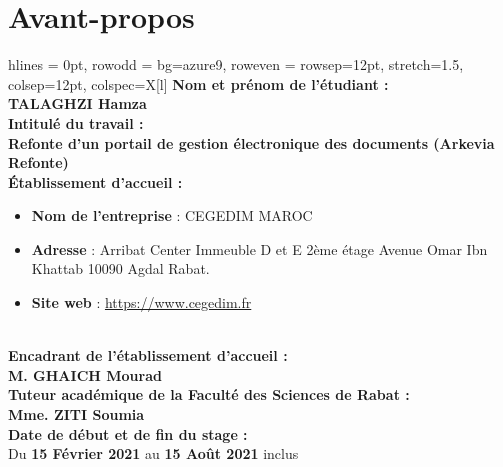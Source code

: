{}
\noindent \section*{Avant-propos}
\vspace{0.25cm}
\begin{table}[htb!]
    \centering
    \begin{tblr}{ 
    hlines = {0pt},
 row{odd} = {bg=azure9},
  row{even} = {rowsep=12pt},
 stretch=1.5,
 colsep=12pt,
 colspec={X[l]}
}
 \textbf{Nom et prénom de l’étudiant :} \\
 \textbf{TALAGHZI Hamza}\\
 \textbf{Intitulé du travail :}\\
\textbf{Refonte d'un portail de gestion électronique des documents (Arkevia Refonte)}\\
\textbf{Établissement d’accueil :}\\
\begin{minipage} [t] {0.9\textwidth} 
\begin{itemize}
    \item \textbf{Nom de l'entreprise} : CEGEDIM MAROC
    \item \textbf{Adresse} : Arribat Center Immeuble D et E 2ème étage Avenue Omar Ibn Khattab 10090 Agdal Rabat.
    \item \textbf{Site web} : \url{https://www.cegedim.fr}
\end{itemize}
\end{minipage}\\
\textbf{Encadrant de l’établissement d’accueil :}\\
\textbf{M. GHAICH Mourad}\\
\textbf{Tuteur académique de la Faculté des Sciences de Rabat :}\\
\textbf{Mme. ZITI Soumia}\\
\textbf{Date de début et de fin du stage :}\\
Du \textbf{15 Février 2021} au \textbf{15 Août 2021} inclus
\end{tblr}

\end{table}
